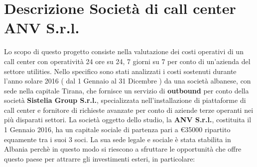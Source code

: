 \chapter{Descrizione Società di call center \ac{ANV S.r.l.}}
\renewcommand{\thesection}{\arabic{section}}
Lo scopo di questo progetto consiste nella valutazione dei costi operativi di un call center con operatività 24 ore su 24, 7 giorni su 7 per conto di un'azienda del settore utilities. \newline
Nello specifico sono stati analizzati i costi sostenuti durante l'anno solare 2016 ( dal 1 Gennaio al 31 Dicembre ) da una società albanese, con sede nella capitale Tirana, che fornisce un servizio di \textbf{outbound} per conto della società \textbf{Sistelia Group S.r.l.}, specializzata nell'installazione di piattaforme di call center e fornitore di richieste avanzate per conto di aziende terze operanti nei più disparati settori. \newline
La società oggetto dello studio, la \textbf{\ac{ANV S.r.l.}}, costituita il 1 Gennaio 2016, ha un capitale sociale di partenza pari a \euro 35000 ripartito equamente tra i suoi 3 soci. La sua sede legale e sociale è stata stabilita in Albania perchè in questo modo si riescono a sfruttare le opportunità che offre questo paese per attrarre gli investimenti esteri, in particolare:
